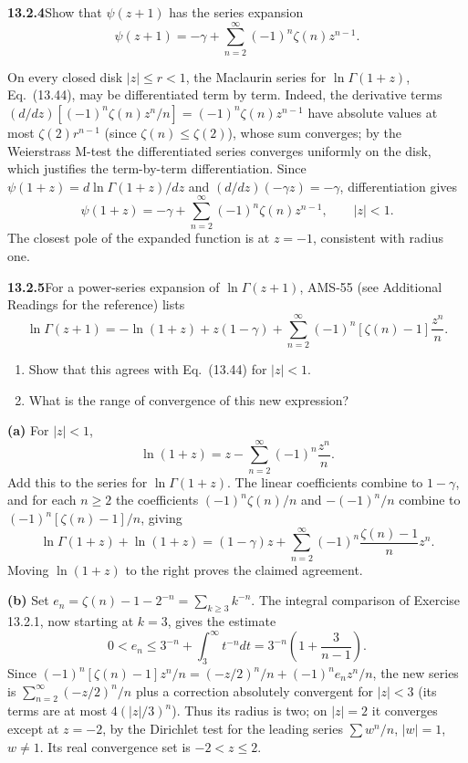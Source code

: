 \par\bigskip
\noindent\textbf{13.2.4}\quad Show that $\psi(z+1)$ has the series expansion
\[
\psi(z+1)=-\gamma+\sum_{n=2}^{\infty}(-1)^{n}\zeta(n)z^{n-1}.
\]
\par\smallskip
{}
\solution
On every closed disk $|z|\le r<1$, the Maclaurin series for
$\ln\Gamma(1+z)$, Eq.~(13.44), may be differentiated term by term.
Indeed, the derivative terms
$(d/dz)[(-1)^n\zeta(n)z^n/n]=(-1)^n\zeta(n)z^{n-1}$ have absolute
values at most $\zeta(2)r^{n-1}$ (since $\zeta(n)\le\zeta(2)$), whose
sum converges; by the Weierstrass M-test the differentiated series
converges uniformly on the disk, which justifies the term-by-term
differentiation.  Since
$\psi(1+z)=d\ln\Gamma(1+z)/dz$ and $(d/dz)(-\gamma z)=-\gamma$,
differentiation gives
\[
\boxed{\psi(1+z)=-\gamma+
\sum_{n=2}^{\infty}(-1)^n\zeta(n)z^{n-1}},
\qquad |z|<1.
\]
  The closest pole of the
expanded function is at $z=-1$, consistent with radius one.


\par\bigskip
\noindent\textbf{13.2.5}\quad For a power-series expansion of
$\ln\Gamma(z+1)$, AMS-55 (see Additional Readings for the reference) lists
\[
\ln\Gamma(z+1)=-\ln(1+z)+z(1-\gamma)
+\sum_{n=2}^{\infty}(-1)^{n}\left[\zeta(n)-1\right]\frac{z^{n}}{n}.
\]
\begin{enumerate}
\item[(a)] Show that this agrees with Eq.~(13.44) for $|z| < 1$.
\item[(b)] What is the range of convergence of this new expression?
\end{enumerate}
\solution
\textbf{(a)} For $|z|<1$,
\[
\ln(1+z)=z-\sum_{n=2}^{\infty}(-1)^n\frac{z^n}{n}.
\]
Add this to the series for $\ln\Gamma(1+z)$.  The linear
coefficients combine to $1-\gamma$, and for each $n\ge2$ the
coefficients $(-1)^n\zeta(n)/n$ and $-(-1)^n/n$ combine to
$(-1)^n[\zeta(n)-1]/n$, giving
\[
\ln\Gamma(1+z)+\ln(1+z)
=(1-\gamma)z+
\sum_{n=2}^{\infty}(-1)^n\frac{\zeta(n)-1}{n}z^n.
\]
Moving $\ln(1+z)$ to the right proves the claimed agreement.

\textbf{(b)} Set $e_n=\zeta(n)-1-2^{-n}=\sum_{k\ge3}k^{-n}$.  The
integral comparison of Exercise 13.2.1, now starting at $k=3$, gives
the estimate
\[
0<e_n\le3^{-n}+\int_3^\infty t^{-n}dt
=3^{-n}\left(1+\frac3{n-1}\right).
\]
Since $(-1)^n[\zeta(n)-1]z^n/n=(-z/2)^n/n+(-1)^ne_nz^n/n$, the new
series is $\sum_{n=2}^\infty(-z/2)^n/n$ plus a correction absolutely
convergent for $|z|<3$ (its terms are at most $4(|z|/3)^n$).  Thus
its radius is two; on $|z|=2$ it converges except at $z=-2$, by the
Dirichlet test for the leading series $\sum w^n/n$, $|w|=1$, $w\ne1$.
Its real convergence set is $\boxed{-2<z\le2}$.

